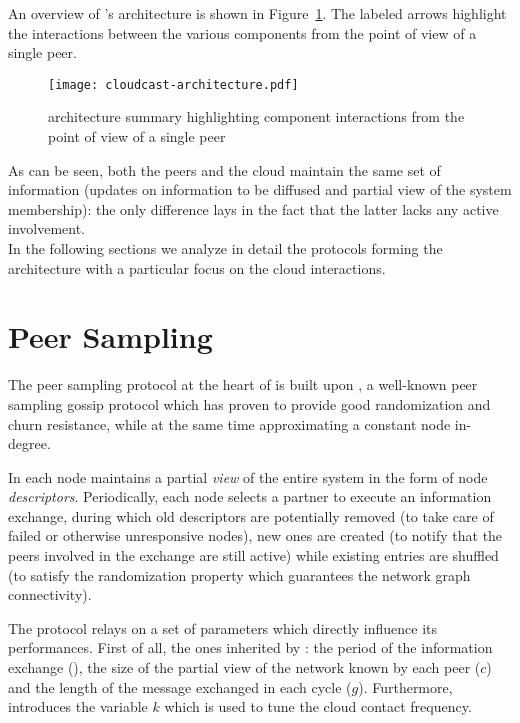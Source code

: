 An overview of \cloudcast's architecture is shown in
Figure~\ref{fig:cloudcast-architecture}. The labeled arrows highlight the
interactions between the various components from the point of view of a
single peer.

\begin{figure}
  \texttt{[image: cloudcast-architecture.pdf]}
  \caption{\cloudcast architecture summary highlighting component
    interactions from the point of view of a single peer}
  \label{fig:cloudcast-architecture}
\end{figure}

As can be seen, both the peers and the cloud maintain the same set of
information (updates on information to be diffused and partial view of
the system membership): the only difference lays in the fact that the latter
lacks any active involvement.
\ \\
In the following sections we analyze in detail the protocols
forming the \cloudcast architecture with a particular focus on the
cloud interactions.

\section{Peer Sampling}
The peer sampling protocol at the heart of \cloudcast is built upon
\cyclon \cite{CYCLON}, a well-known peer sampling gossip protocol
which has proven to provide good randomization and churn resistance,
while at the same time approximating a constant node in-degree.

In \cloudcast each node maintains a partial \emph{view} of the entire system
in the form of node \emph{descriptors}. Periodically, each node selects
a partner to execute an information exchange, during which old
descriptors are potentially removed (to take care of failed or
otherwise unresponsive nodes), new ones are created (to notify that the
peers involved in the exchange are still active) while existing
entries are shuffled (to satisfy the randomization property which
guarantees the network graph connectivity).

The protocol relays on a set of parameters which directly influence its
performances. First of all, the ones inherited by \cyclon: the period of
the information exchange (\deltacyclon), the size of the partial
view of the network known by each peer ($c$) and the length
of the message exchanged in each cycle ($g$). Furthermore,
\cloudcast introduces the variable $k$ which is used to tune the
cloud contact frequency.

